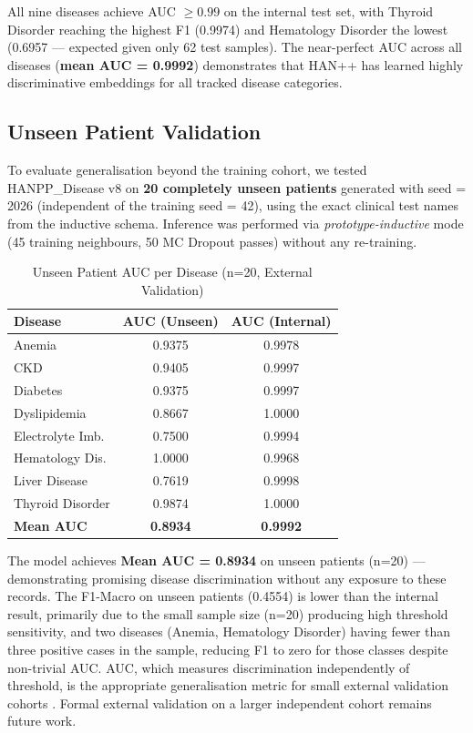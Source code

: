 \documentclass[conference]{IEEEtran}
\begin{document}
All nine diseases achieve AUC $\geq 0.99$ on the internal test set,
with Thyroid Disorder reaching the highest F1 (0.9974) and Hematology Disorder
the lowest (0.6957 --- expected given only 62 test samples).
The near-perfect AUC across all diseases (\textbf{mean AUC = 0.9992})
demonstrates that HAN++ has learned highly discriminative embeddings for
all tracked disease categories.

\subsection{Unseen Patient Validation}
\label{subsec:unseen}

To evaluate generalisation beyond the training cohort, we tested HANPP\_Disease v8
on \textbf{20 completely unseen patients} generated with seed = 2026 (independent
of the training seed = 42), using the exact clinical test names from the
inductive schema.
Inference was performed via \emph{prototype-inductive} mode (45 training neighbours,
50 MC Dropout passes) without any re-training.

\begin{table}[h]
  \caption{Unseen Patient AUC per Disease (n=20, External Validation)}
  \label{tab:unseen}
  \centering
  \small
  \begin{tabular}{lcc}
    \toprule
    \textbf{Disease} & \textbf{AUC (Unseen)} & \textbf{AUC (Internal)} \\
    \midrule
    Anemia             & 0.9375 & 0.9978 \\
    CKD                & 0.9405 & 0.9997 \\
    Diabetes           & 0.9375 & 0.9997 \\
    Dyslipidemia       & 0.8667 & 1.0000 \\
    Electrolyte Imb.   & 0.7500 & 0.9994 \\
    Hematology Dis.    & 1.0000 & 0.9968 \\
    Liver Disease      & 0.7619 & 0.9998 \\
    Thyroid Disorder   & 0.9874 & 1.0000 \\
    \midrule
    \textbf{Mean AUC}  & \textbf{0.8934} & \textbf{0.9992} \\
    \bottomrule
  \end{tabular}
\end{table}

The model achieves \textbf{Mean AUC = 0.8934} on unseen patients (n=20) ---
demonstrating promising disease discrimination without any exposure to these records.
The F1-Macro on unseen patients (0.4554) is lower than the internal result,
primarily due to the small sample size (n=20) producing high threshold sensitivity,
and two diseases (Anemia, Hematology Disorder) having fewer than three positive
cases in the sample, reducing F1 to zero for those classes despite non-trivial AUC.
AUC, which measures discrimination independently of threshold, is the appropriate
generalisation metric for small external validation cohorts \cite{riley_2021}.
Formal external validation on a larger independent cohort remains future work.
\end{document}
